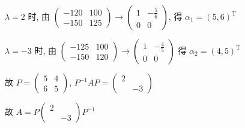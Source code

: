 \begin{enumerate}
			       \( \lambda = 2 \) 时, 由 \( \begin{pmatrix}
				       -120 & 100 \\
				       -150 & 125
			       \end{pmatrix} \rightarrow \begin{pmatrix}
				       1 & -\frac{5}{6} \\
				       0 & 0
			       \end{pmatrix} \), 得 \( \alpha_{1} = (5, 6)^{\mathrm{T}} \)

			       \( \lambda = -3 \) 时, 由 \( \begin{pmatrix}
				       -125 & 100 \\
				       -150 & 120
			       \end{pmatrix} \rightarrow \begin{pmatrix}
				       1 & -\frac{4}{5} \\
				       0 & 0
			       \end{pmatrix} \) 得 \( \alpha_{2} = (4, 5)^{\mathrm{T}} \)

			       故 \( P = \begin{pmatrix}
				       5 & 4 \\
				       6 & 5
			       \end{pmatrix} \), \( P^{-1}AP = \begin{pmatrix}
				       2 &    \\
				         & -3
			       \end{pmatrix} \)

			       故 \( A = P\begin{pmatrix}
				       2 &    \\
				         & -3
			       \end{pmatrix}P^{-1} \)


\end{enumerate}
